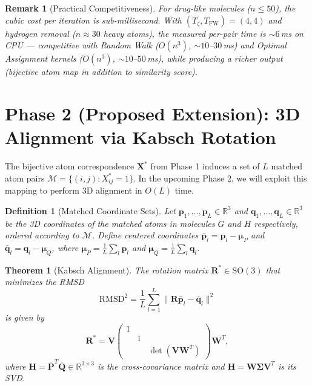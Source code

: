\documentclass[conference]{IEEEtran}
\newtheorem{theorem}{Theorem}
\newtheorem{remark}{Remark}
\newtheorem{definition}{Definition}
\begin{document}
\begin{remark}[Practical Competitiveness]
For drug-like molecules ($n \!\leq\! 50$),
the cubic cost per iteration is sub-millisecond.
With $(T_\zeta, T_{\mathrm{FW}}) = (4, 4)$ and hydrogen
removal ($n \!\approx\! 30$ heavy atoms), the measured
per-pair time is ${\sim}6$\,ms on CPU ---
competitive with Random Walk ($O(n^3)$, ${\sim}10$--$30$\,ms)
and Optimal Assignment kernels ($O(n^3)$, ${\sim}10$--$50$\,ms),
while producing a richer output (bijective atom map
in addition to similarity score).
\end{remark}


\section{Phase 2 (Proposed Extension): 3D Alignment via Kabsch Rotation}
\label{sec:3d-alignment}

The bijective atom correspondence $\mathbf{X}^*$ from Phase 1
induces a set of $L$ matched atom pairs
$\mathcal{M} = \{(i,j) : X^*_{ij} = 1\}$.
In the upcoming Phase 2, we will exploit this mapping to perform 3D alignment in $O(L)$ time.

\begin{definition}[Matched Coordinate Sets]
\label{def:matched-coords}
Let $\mathbf{p}_1, \ldots, \mathbf{p}_L \in \mathbb{R}^3$
and $\mathbf{q}_1, \ldots, \mathbf{q}_L \in \mathbb{R}^3$
be the 3D coordinates of the matched atoms in molecules
$G$ and $H$ respectively, ordered according to $\mathcal{M}$.
Define centered coordinates
$\bar{\mathbf{p}}_l = \mathbf{p}_l - \boldsymbol{\mu}_P$ and
$\bar{\mathbf{q}}_l = \mathbf{q}_l - \boldsymbol{\mu}_Q$,
where $\boldsymbol{\mu}_P = \frac{1}{L}\sum_l \mathbf{p}_l$
and $\boldsymbol{\mu}_Q = \frac{1}{L}\sum_l \mathbf{q}_l$.
\end{definition}

\begin{theorem}[Kabsch Alignment]
\label{thm:kabsch}
The rotation matrix $\mathbf{R}^* \in \mathrm{SO}(3)$ that
minimizes the RMSD
\begin{equation}
\mathrm{RMSD}^2 = \frac{1}{L}
  \sum_{l=1}^{L} \|\mathbf{R}\bar{\mathbf{p}}_l - \bar{\mathbf{q}}_l\|^2
\label{eq:rmsd}
\end{equation}
is given by
\begin{equation}
\mathbf{R}^* = \mathbf{V}
  \begin{pmatrix} 1 & & \\ & 1 & \\ & & \det(\mathbf{V}\mathbf{W}^T) \end{pmatrix}
  \mathbf{W}^T,
\label{eq:kabsch-rotation}
\end{equation}
where $\mathbf{H} = \bar{\mathbf{P}}^T \bar{\mathbf{Q}} \in \mathbb{R}^{3 \times 3}$
is the cross-covariance matrix and $\mathbf{H} = \mathbf{W}\boldsymbol{\Sigma}\mathbf{V}^T$
is its SVD.
\end{theorem}
\end{document}
